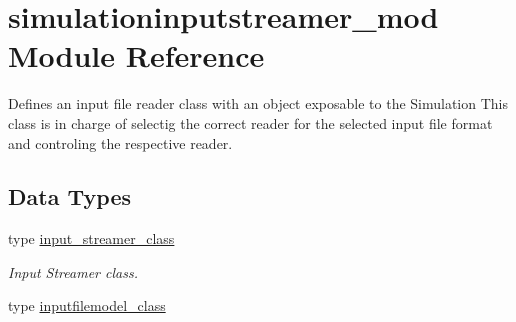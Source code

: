 \hypertarget{namespacesimulationinputstreamer__mod}{}\section{simulationinputstreamer\+\_\+mod Module Reference}
\label{namespacesimulationinputstreamer__mod}


Defines an input file reader class with an object exposable to the Simulation This class is in charge of selectig the correct reader for the selected input file format and controling the respective reader.  


\subsection*{Data Types}
\begin{DoxyCompactItemize}
\item 
type \mbox{\hyperlink{structsimulationinputstreamer__mod_1_1input__streamer__class}{input\+\_\+streamer\+\_\+class}}
\begin{DoxyCompactList}\small\item\em Input Streamer class. \end{DoxyCompactList}\item 
type \mbox{\hyperlink{structsimulationinputstreamer__mod_1_1inputfilemodel__class}{inputfilemodel\+\_\+class}}
\end{DoxyCompactItemize}
